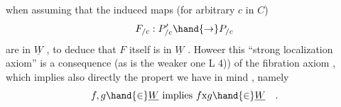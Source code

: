 when assuming that the induced maps (for arbitrary $c$ in $C$)
\[ F_{/c} : P'_{/c}\hand{\to} P_{/c} \]
are in $\underline{W}$ , to deduce that $F$ itself is in $\underline{W}$ . Howeer this ``strong
localization axiom'' is a consequence (as is the weaker one L 4)) of
\margin{$\times$} the fibration axiom , which implies also directly the propert we have
in mind , namely 
\[ f,g \hand{\in} \underline{W} \text{ implies } f\mathrm{x}g \hand{\in} \underline{W} \quad . \]

